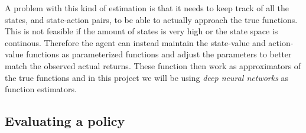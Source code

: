 \documentclass[11pt]{article}
\begin{document}
A problem with this kind of estimation is that it needs to keep track of all the states, and state-action
pairs, to be able to actually approach the true functions.
This is not feasible if the amount of states is very high or the state space is continous.
Therefore the agent can instead maintain the state-value and action-value functions as
parameterized functions and adjust the parameters to better match the observed actual returns\cite{RLBook}.
These function then work as approximators of the true functions and in this project we will
be using \textit{deep neural networks} as function estimators.



\subsection{Evaluating a policy}

%
%
\end{document}
